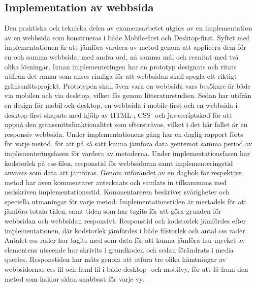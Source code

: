 \documentclass[11pt]{article}
\begin{document}
\subsection{Implementation av webbsida}
Den praktiska och tekniska delen av examensarbetet utgörs av en implementation av en webbsida som konstrueras i både Mobile-first och Desktop-first. Syftet med implementationen är att jämföra vardera av metod genom att applicera dem för en och samma webbsida, med andra ord, nå samma mål och resultat med två olika lösningar. Innan implementeringen har en prototyp designats och ritats utifrån det ramar som anses rimliga för att webbsidan skall spegla ett riktigt gränssnittsprojekt. Prototypen skall även vara en webbsida vars besökare är både via mobilen och via desktop, vilket fås genom litteraturstudien. Sedan har utifrån en design för mobil och desktop, en webbsida i mobile-first och en webbsida i desktop-first skapats med hjälp av HTML-, CSS- och javascriptskod för att uppnå den gränssnittsfunktionalitet som eftersträvas, vilket i det här fallet är en responsiv webbsida. Under implementationens gång har en daglig rapport förts för varje metod, för att på så sätt kunna jämföra data gentemot samma period av implementeringsfasen för vardera av metoderna. Under implementationsfasen har kodstorlek på css-filen, responstid för webbsidorna samt implementeringstid använts som data att jämföras. Genom utförandet av en dagbok för respektive metod har även kommentarer antecknats och samlats in tillsammans med nedskriven implementationsstid. Kommentareren beskriver svårigheter och speciella utmaningar för varje metod. Implementationstiden är mestadels för att jämföra totala tiden, samt tiden som har tagits för att göra grunden för webbsidan och webbsidan responsivt. Responstid och kodstorlek jämfördes efter implementationen, där kodstorlek jämfördes i både filstorlek och antal css rader. Antalet css rader har tagits med som data för att kunna jämföra hur mycket av elementens utseende har skrivits i grundkoden och sedan förändrats i media queries. Responstiden har mäts genom att utföra tre olika hämtningar av webbsidornas css-fil och html-fil i både desktop- och mobilvy, för att få fram den metod som laddar sidan snabbast för varje vy.
  
\end{document}
